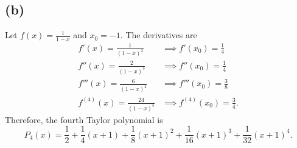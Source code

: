 \documentclass{article}
\begin{document}
\subsection*{(b)}
Let $f(x) = \frac{1}{1-x}$ and $x_0 = -1$. The derivatives are
\begin{align}
	f'(x) = \frac{1}{(1-x)^2} &\implies f'(x_0) = \frac{1}{4} \\
	f''(x) = \frac{2}{(1-x)^3} &\implies f''(x_0) = \frac{1}{4} \\
	f'''(x) = \frac{6}{(1-x)^4} &\implies f'''(x_0) = \frac{3}{8} \\
	f^{(4)}(x) = \frac{24}{(1-x)^5} &\implies f^{(4)}(x_0) = \frac{3}{4}.
\end{align}
Therefore, the fourth Taylor polynomial is
\begin{equation}
	P_4(x) = \frac{1}{2} + \frac{1}{4}(x + 1) + \frac{1}{8}(x + 1)^2 + \frac{1}{16}(x + 1)^3 + \frac{1}{32}(x + 1)^4.
\end{equation}
\end{document}
